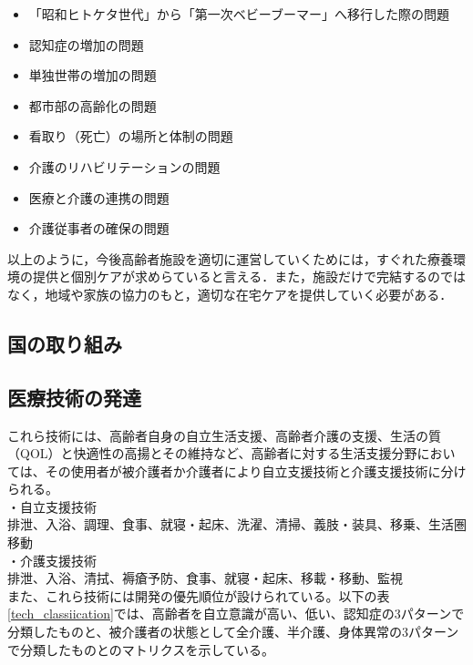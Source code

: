 \begin{itemize}
 \item 「昭和ヒトケタ世代」から「第一次ベビーブーマー」へ移行した際の問題
 \item 認知症の増加の問題
 \item 単独世帯の増加の問題
 \item 都市部の高齢化の問題
 \item 看取り（死亡）の場所と体制の問題
 \item 介護のリハビリテーションの問題
 \item 医療と介護の連携の問題
 \item 介護従事者の確保の問題
\end{itemize}

以上のように，今後高齢者施設を適切に運営していくためには，すぐれた療養環境の提供と個別ケアが求めらていると言える．また，施設だけで完結するのではなく，地域や家族の協力のもと，適切な在宅ケアを提供していく必要がある．

\subsection{国の取り組み}


\subsection{医療技術の発達}


これら技術には、高齢者自身の自立生活支援、高齢者介護の支援、生活の質（QOL）と快適性の高揚とその維持など、高齢者に対する生活支援分野においては、その使用者が被介護者か介護者により自立支援技術と介護支援技術に分けられる。\\
・自立支援技術 \\
排泄、入浴、調理、食事、就寝・起床、洗濯、清掃、義肢・装具、移乗、生活圏移動 \\
・介護支援技術 \\
排泄、入浴、清拭、褥瘡予防、食事、就寝・起床、移載・移動、監視 \\
また、これら技術には開発の優先順位が設けられている。以下の表\ref{tech_classiication}では、高齢者を自立意識が高い、低い、認知症の3パターンで分類したものと、被介護者の状態として全介護、半介護、身体異常の3パターンで分類したものとのマトリクスを示している。


